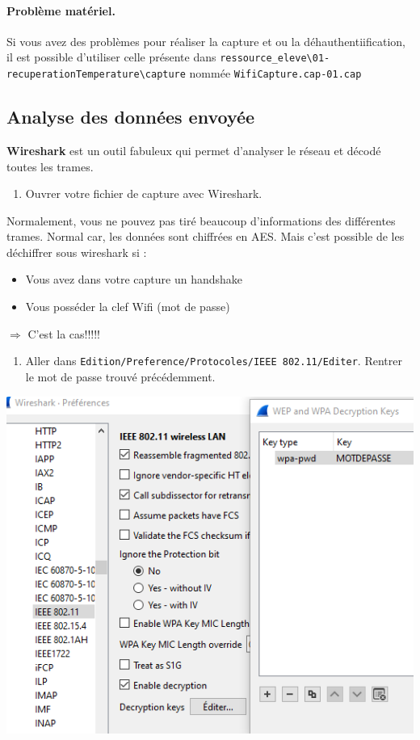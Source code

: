\documentclass[french, 12pt]{article}%
\newcommand{\itemE}{\item[$\bullet$]}
\begin{document}
\paragraph{Problème matériel.} Si vous avez des problèmes pour réaliser la capture et ou la déhauthentiification, il est possible d'utiliser celle présente dans \verb?ressource_eleve\01-recuperationTemperature\capture? nommée \verb?WifiCapture.cap-01.cap?

\subsection{Analyse des données envoyée}

\textbf{Wireshark} est un outil fabuleux qui permet d'analyser le réseau et décodé toutes les trames.

\begin{enumerate}[resume]
\item Ouvrer votre fichier de capture avec Wireshark. 
\end{enumerate}

Normalement, vous ne pouvez pas tiré beaucoup d'informations des différentes trames. Normal car, les données sont chiffrées en AES. Mais c'est possible de les déchiffrer sous wireshark si : 
\begin{itemize}
\itemE Vous avez dans votre capture un handshake
\itemE Vous posséder la clef Wifi (mot de passe)
\end{itemize}

$\Rightarrow$ C'est la cas!!!!!

\begin{enumerate}[resume]
\item Aller dans \verb?Edition/Preference/Protocoles/IEEE 802.11/Editer?. Rentrer le mot de passe trouvé précédemment. 
\end{enumerate}


\begin{center}
\includegraphics[scale=0.7]{./ressource/wiresharkMotdePasse}
\end{center}
\end{document}
